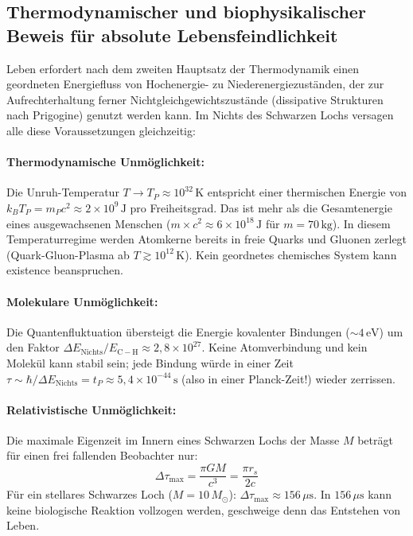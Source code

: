 ﻿\documentclass[12pt,a4paper]{report}
\begin{document}
\subsection{Thermodynamischer und biophysikalischer Beweis für absolute Lebensfeindlichkeit}

Leben erfordert nach dem zweiten Hauptsatz der Thermodynamik einen geordneten Energiefluss von Hochenergie- zu Niederenergiezuständen, der zur Aufrechterhaltung ferner Nichtgleichgewichtszustände (dissipative Strukturen nach Prigogine) genutzt werden kann. Im Nichts des Schwarzen Lochs versagen alle diese Voraussetzungen gleichzeitig:

\paragraph{Thermodynamische Unmöglichkeit:}
Die Unruh-Temperatur $T \to T_P \approx 10^{32}\,\text{K}$ entspricht einer thermischen Energie von $k_B T_P = m_P c^2 \approx 2 \times 10^9\,\text{J}$ pro Freiheitsgrad. Das ist mehr als die Gesamtenergie eines ausgewachsenen Menschen ($m \times c^2 \approx 6 \times 10^{18}\,\text{J}$ für $m = 70\,\text{kg}$). In diesem Temperaturregime werden Atomkerne bereits in freie Quarks und Gluonen zerlegt (Quark-Gluon-Plasma ab $T \gtrsim 10^{12}\,\text{K}$). Kein geordnetes chemisches System kann existence beanspruchen.

\paragraph{Molekulare Unmöglichkeit:}
Die Quantenfluktuation übersteigt die Energie kovalenter Bindungen ($\sim 4\,\text{eV}$) um den Faktor $\Delta E_{\mathrm{Nichts}} / E_{\mathrm{C-H}} \approx 2{,}8 \times 10^{27}$. Keine Atomverbindung und kein Molekül kann stabil sein; jede Bindung würde in einer Zeit $\tau \sim \hbar/\Delta E_{\mathrm{Nichts}} = t_P \approx 5{,}4 \times 10^{-44}\,\text{s}$ (also in einer Planck-Zeit!) wieder zerrissen.

\paragraph{Relativistische Unmöglichkeit:}
Die maximale Eigenzeit im Innern eines Schwarzen Lochs der Masse $M$ beträgt für einen frei fallenden Beobachter nur:
\begin{equation*}
    \Delta\tau_{\max} = \frac{\pi G M}{c^3} = \frac{\pi r_s}{2c}
\end{equation*}
Für ein stellares Schwarzes Loch ($M = 10\,M_\odot$): $\Delta\tau_{\max} \approx 156\,\mu\text{s}$. In $156\,\mu\text{s}$ kann keine biologische Reaktion vollzogen werden, geschweige denn das Entstehen von Leben.
\end{document}
